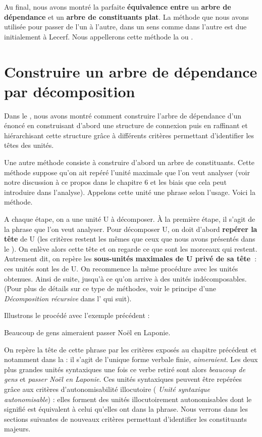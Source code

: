 Au final, nous avons montré la parfaite \textbf{équivalence entre} un \textbf{arbre de dépendance} et un \textbf{arbre de constituants plat}. La méthode que nous avons utilisée pour passer de l’un à l’autre, dans un sens comme dans l’autre est due initialement à Lecerf. Nous appellerons cette méthode la  ou .

\section{ Construire un arbre de dépendance par décomposition}\label{sec:3.4.6}

Dans le , nous avons montré comment construire l’arbre de dépendance d’un énoncé en construisant d’abord une structure de connexion puis en raffinant et hiérarchisant cette structure grâce à différents critères permettant d’identifier les têtes des unités.

Une autre méthode consiste à construire d’abord un arbre de constituants. Cette méthode suppose qu’on ait repéré l’unité maximale que l’on veut analyser (voir notre discussion à ce propos dans le chapitre 6 et les biais que cela peut introduire dans l’analyse). Appelons cette unité une phrase selon l’usage. Voici la méthode.

A chaque étape, on a une unité U à décomposer. À la première étape, il s’agit de la phrase que l’on veut analyser. Pour décomposer U, on doit d’abord \textbf{repérer la tête} de U (les critères restent les mêmes que ceux que nous avons présentés dans le ). On enlève alors cette tête et on regarde ce que sont les morceaux qui restent. Autrement dit, on repère les \textbf{sous-unités} \textbf{maximales de U privé de sa tête~}: ces unités sont les  de U. On recommence la même procédure avec les unités obtenues. Ainsi de suite, jusqu’à ce qu’on arrive à des unités indécomposables. (Pour plus de détails sur ce type de méthodes, voir le principe d’une \textit{Décomposition récursive} dans l’ qui suit).

Illustrons le procédé avec l’exemple précédent :

\ea
Beaucoup de gens aimeraient passer Noël en Laponie.
\z

On repère la tête de cette phrase par les critères exposés au chapitre précédent et notamment dans la  : il s’agit de l’unique forme verbale finie, \textit{aimeraient}. Les deux plus grandes unités syntaxiques une fois ce verbe retiré sont alors \textit{beaucoup de gens} et \textit{passer Noël en Laponie}. Ces unités syntaxiques peuvent être repérées grâce aux critères d’autonomisabilité illocutoire ( \textit{Unité syntaxique autonomisable}) : elles forment des unités illocutoirement autonomisables dont le signifié est équivalent à celui qu’elles ont dans la phrase. Nous verrons dans les sections suivantes de nouveaux critères permettant d’identifier les constituants majeurs.


